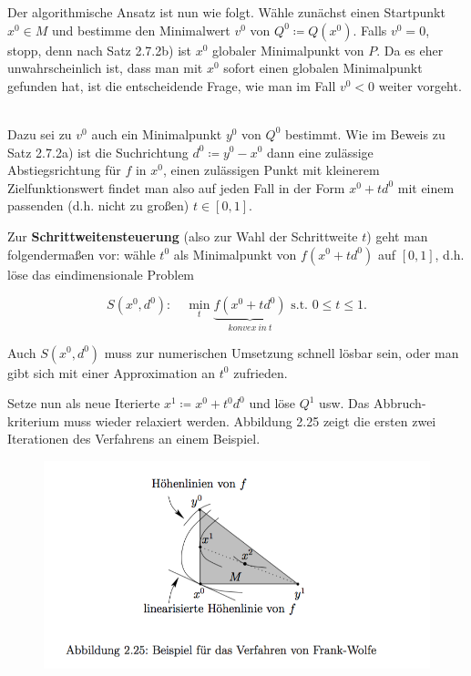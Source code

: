 \documentclass[12pt]{extreport} %
\theoremstyle{named}
\theoremstyle{nnamed}
\theoremstyle{itshape}
\theoremstyle{normal}
\begin{document}
Der algorithmische Ansatz ist nun wie folgt. Wähle zunächst einen Startpunkt $x^0 \in M$ und bestimme den Minimalwert $v^0$ von $Q^0 \coloneqq Q(x^0)$. Falls $v^0 = 0$, stopp, denn nach Satz 2.7.2b) ist $x^0$ globaler Minimalpunkt von $P$. Da es eher unwahrscheinlich ist, dass man mit $x^0$ sofort einen globalen Minimalpunkt gefunden hat, ist die entscheidende Frage, wie man im Fall $v^0 < 0$ weiter vorgeht. ~\bigskip

Dazu sei zu $v^0$ auch ein Minimalpunkt $y^0$ von $Q^0$ bestimmt. Wie im Beweis zu Satz 2.7.2a) ist die Suchrichtung  $d^0 \coloneqq y^0 - x^0$ dann eine zulässige Abstiegsrichtung für $f$ in $x^0$, einen zulässigen Punkt mit kleinerem Zielfunktionswert findet man also auf jeden Fall in der Form $x^0 + t d^0$ mit einem passenden (d.h. nicht zu großen) $t \in [0, 1]$. ~\bigskip

Zur \textbf{Schrittweitensteuerung} (also zur Wahl der Schrittweite $t$) geht man folgendermaßen vor: wähle $t^0$ als Minimalpunkt von $f(x^0 + t d^0)$ auf $[0, 1]$, d.h. löse das eindimensionale Problem

	$$ S(x^0, d^0): \quad \min_t \underbrace{f(x^0 + t d^0)}_{konvex~in~t} \text{ s.t. } 0 \leq t \leq 1.$$

Auch $S(x^0, d^0)$ muss zur numerischen Umsetzung schnell lösbar sein, oder man gibt sich mit einer Approximation an $t^0$ zufrieden. ~\bigskip

Setze nun als neue Iterierte $x^1 \coloneqq x^0 + t^0 d^0$ und löse $Q^1$ usw. Das Abbruch-kriterium muss wieder relaxiert werden. Abbildung 2.25 zeigt die ersten zwei Iterationen des Verfahrens an einem Beispiel.

\begin{figure}[h!] \centering
	\includegraphics[scale=0.55]{img/vl-alg-23}
\end{figure}
\end{document}
